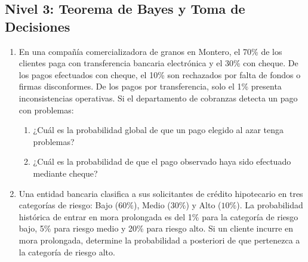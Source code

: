 \subsection*{Nivel 3: Teorema de Bayes y Toma de Decisiones}
\begin{enumerate}[resume]
    \item En una compañía comercializadora de granos en Montero, el 70\% de los clientes paga con transferencia bancaria electrónica y el 30\% con cheque. De los pagos efectuados con cheque, el 10\% son rechazados por falta de fondos o firmas disconformes. De los pagos por transferencia, solo el 1\% presenta inconsistencias operativas. Si el departamento de cobranzas detecta un pago con problemas:
    \begin{enumerate}[label=\alph*)]
        \item ¿Cuál es la probabilidad global de que un pago elegido al azar tenga problemas?
        \item ¿Cuál es la probabilidad de que el pago observado haya sido efectuado mediante cheque?
    \end{enumerate}
    \item Una entidad bancaria clasifica a sus solicitantes de crédito hipotecario en tres categorías de riesgo: Bajo ($60\%$), Medio ($30\%$) y Alto ($10\%$). La probabilidad histórica de entrar en mora prolongada es del 1\% para la categoría de riesgo bajo, 5\% para riesgo medio y 20\% para riesgo alto. Si un cliente incurre en mora prolongada, determine la probabilidad a posteriori de que pertenezca a la categoría de riesgo alto.
\end{enumerate}
